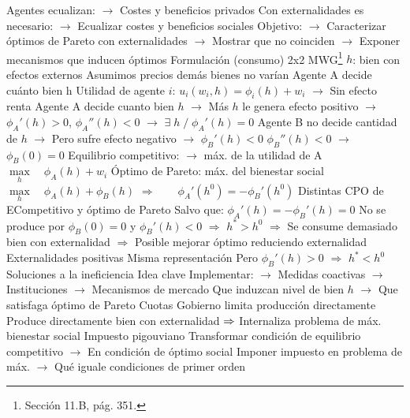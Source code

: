 \documentclass{nuevotema}
\begin{document}
\begin{esquemal}
				\4[] Agentes ecualizan:
				\4[] $\to$ Costes y beneficios privados
				\4[] Con externalidades es necesario:
				\4[] $\to$ Ecualizar costes y beneficios sociales
				\4 Objetivo:
				\4[] $\to$ Caracterizar óptimos de Pareto con externalidades
				\4[] $\to$ Mostrar que no coinciden
				\4[] $\to$ Exponer mecanismos que inducen óptimos
		\2 Formulación (consumo)
			\3 2x2
			\3 MWG\footnote{Sección 11.B, pág. 351.}
				\4 $h$: bien con efectos externos
				\4 Asumimos precios demás bienes no varían
				\4 Agente A decide cuánto bien h
				\4 Utilidad de agente $i$:
				\4[] $u_i(w_i, h) = \phi_i(h) + w_i$
				\4[] $\to$ Sin efecto renta
				\4 Agente A decide cuanto bien $h$
				\4[] $\to$ Más $h$ le genera efecto positivo
				\4[] $\to$ $\phi_A'(h) > 0$, $\phi_A''(h) < 0$
				\4[] $\to$ $\exists \; h \; / \; \phi_A'(h) = 0$
				\4 Agente B no decide cantidad de $h$
				\4[] $\to$ Pero sufre efecto negativo
				\4[] $\to$ $\phi_B'(h) < 0$ \quad $\phi_B''(h) < 0$
				\4[] $\to$ $\phi_B(0) = 0$
				\4 Equilibrio competitivo:
				\4[] $\to$ máx. de la utilidad de A
				\4[] $\underset{h}{\max} \quad \phi_A(h)+w_i$
				\4[] 
				\4 Óptimo de Pareto: máx. del bienestar social
				\4[] $\underset{h}{\max} \quad \phi_A(h) + \phi_B(h)$
				\4[] 
				\4[] $\Rightarrow \quad \quad  \phi_A'(h^0) = - \phi_B'(h^0)$
				\4 Distintas CPO de ECompetitivo y óptimo de Pareto
				\4[] Salvo que:
				\4[] $\phi_A'(h) = -\phi_B'(h) = 0$
				\4[] No se produce por $\phi_B(0)=0$ y $\phi_B'(h) < 0$
				\4[] $\Rightarrow$ $h^* > h^0$
				\4[] $\Rightarrow$ Se consume demasiado bien con externalidad
				\4[] $\Rightarrow$ Posible mejorar óptimo reduciendo externalidad
				\4[] 
				\4 Externalidades positivas
				\4[] Misma representación
				\4[] Pero $\phi_B'(h) > 0$
				\4[] $\Rightarrow$ $h^* < h^0$
		\2 Soluciones a la ineficiencia
			\3 Idea clave
				\4 Implementar:
				\4[] $\to$ Medidas coactivas
				\4[] $\to$ Instituciones
				\4[] $\to$ Mecanismos de mercado
				\4[] Que induzcan nivel de bien $h$
				\4[] $\to$ Que satisfaga óptimo de Pareto
			\3 Cuotas
				\4 Gobierno limita producción directamente
				\4[] Produce directamente bien con externalidad
				\4[] $\Rightarrow$ Internaliza problema de máx. bienestar social
			\3 Impuesto pigouviano
				\4 Transformar condición de equilibrio competitivo
				\4[] $\to$ En condición de óptimo social
				\4 Imponer impuesto en problema de máx.
				\4[] $\to$ Qué iguale condiciones de primer orden

\end{esquemal}
\end{document}
